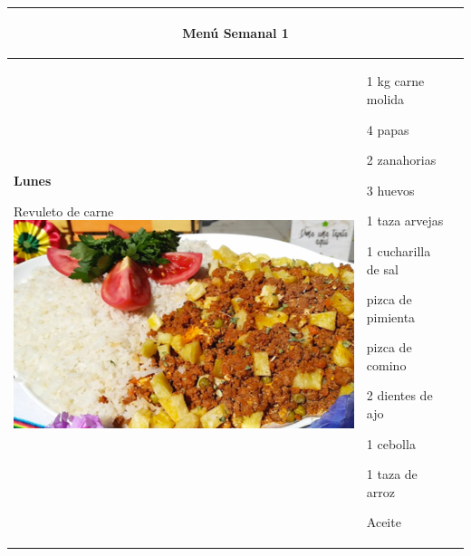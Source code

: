 \documentclass[menu.tex]{subfiles}
\begin{document}
    
\begin{tabular} {p{3.5cm} p{4cm} p{9cm}}
\multicolumn{3}{c}{\begin{LARGE}Menú Semanal 1\end{LARGE}}\\
\hline

    \pbox{20cm}
    {
        \rule{0pt}{3ex}\begin{large}\textbf{Lunes}\end{large}\\ 
        \rule{0pt}{2ex}Revuleto de carne \\
        \includegraphics[scale=0.16]{revuelto-de-carne} 
    } & 
    \vspace{-1.8cm}            
    \begin{compactitem} 
        \begin{scriptsize}
            \item 1 kg carne molida
            \item 4 papas
            \item 2 zanahorias
            \item 3 huevos
            \item 1 taza arvejas
            \item 1 cucharilla de sal
            \item pizca de pimienta
            \item pizca de comino
            \item 2 dientes de ajo
            \item 1 cebolla
            \item 1 taza de arroz
            \item Aceite
        \end{scriptsize}
    \end{compactitem}&

\end{tabular}
\end{document}
